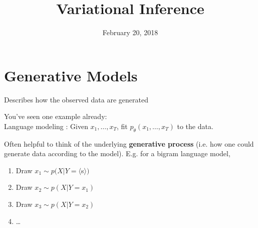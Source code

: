 \documentclass{beamer}
\title[latent]{Variational Inference}
\author[Yoon Kim]{February 20, 2018}
\institute[Harvard SEAS]{ 
{ }


}
\date{}
\let\tempone\itemize
\let\temptwo\enditemize
\renewenvironment{itemize}{\tempone\addtolength{\itemsep}{0.5\baselineskip}}{\temptwo}
\newcommand{\xvec}{\mathbf{x}}
\begin{document}
\begin{frame}
  \titlepage
\end{frame}

\begin{frame}
  \tableofcontents
\end{frame}
\section{Generative Models}

\begin{frame}
  \begin{center}
   \end{center} 
   \begin{itemize}   
   \item Describes how the observed data are generated
   \item You've seen one example already: \\
  Language modeling : Given $x_1, \dots, x_T$, fit $p_\theta(x_1, \dots, x_T)$ to the data.
   \end{itemize}
\end{frame}

\begin{frame}
  \begin{center}
   \end{center}
Often helpful to think of the underlying \textbf{generative process} (i.e. how one could generate data according to the model). E.g. for a bigram language model,
\begin{enumerate}
\item Draw $x_1 \sim p(X | Y = \langle$s$\rangle)$
\item Draw $x_2 \sim p(X| Y = x_1)$
\item Draw $x_3 \sim p(X| Y = x_2)$
\item \dots
\end{enumerate}

\end{frame}
\end{document}
